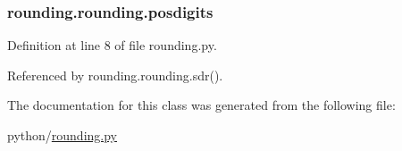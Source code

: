 \subsubsection[{posdigits}]{\setlength{\rightskip}{0pt plus 5cm}rounding.\-rounding.\-posdigits}\label{classrounding_1_1rounding_a36f4099d60c7a6ed915770aac999c3c3}


Definition at line 8 of file rounding.\-py.



Referenced by rounding.\-rounding.\-sdr().



The documentation for this class was generated from the following file\-:\begin{DoxyCompactItemize}
\item 
python/\hyperlink{rounding_8py}{rounding.\-py}\end{DoxyCompactItemize}
